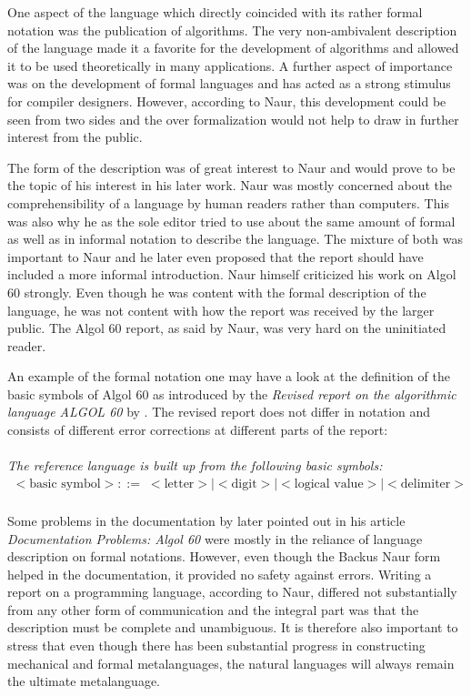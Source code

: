 \documentclass{article}
\begin{document}
One aspect of the language which directly coincided with its rather formal notation was the publication of algorithms. The very non-ambivalent description of the language made it a favorite for the development of algorithms and allowed it to be used theoretically in many applications. A further aspect of importance was on the development of formal languages and has acted as a strong stimulus for compiler designers. However, according to Naur, this development could be seen from two sides and the over formalization would not help to draw in further interest from the public.

The form of the description was of great interest to Naur and would prove to be the topic of his interest in his later work. Naur was mostly concerned about the comprehensibility of a language by human readers rather than computers. This was also why he as the sole editor tried to use about the same amount of formal as well as in informal notation to describe the language. The mixture of both was important to Naur and he later even proposed that the report should have included a more informal introduction. Naur himself criticized his work on Algol 60 strongly. Even though he was content with the formal description of the language, he was not content with how the report was received by the larger public. The Algol 60 report, as said by Naur, was very hard on the uninitiated reader.

An example of the formal notation one may have a look at the definition of the basic symbols of Algol 60 as introduced by the \textit{Revised report on the algorithmic language ALGOL 60} by \cite{Backus1963RevisedRO}. The revised report does not differ in notation and consists of different error corrections at different parts of the report:
\\ \\
\textit{The reference language is built up from the following basic symbols:}
\begin{equation} \label{eq5}
\begin{split}
<\text{basic symbol}> ::=&<\text{letter}>|<\text{digit}>|<\text{logical value}>|<\text{delimiter}> \\
\end{split}
\end{equation}

Some problems in the documentation by \citet{naur1963documentation} later pointed out in his article \textit{Documentation Problems: Algol 60} were mostly in the reliance of language description on formal notations. However, even though the Backus Naur form helped in the documentation, it provided no safety against errors. Writing a report on a programming language, according to Naur, differed not substantially from any other form of communication and the integral part was that the description must be complete and unambiguous. It is therefore also important to stress that even though there has been substantial progress in constructing mechanical and formal metalanguages, the natural languages will always remain the ultimate metalanguage.
\end{document}
